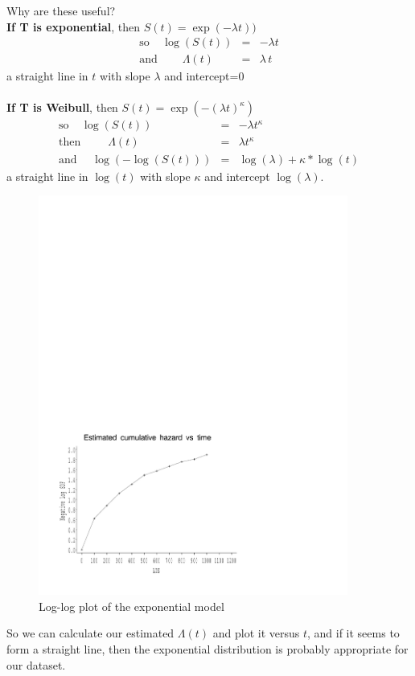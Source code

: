 \documentclass[11pt,psfig]{book}
\begin{document}
Why are these useful?
\\[2ex]
{\bf If T is exponential}, then $S(t) = \exp(-\lambda t))$
\begin{eqnarray*}
\mbox{so}~~~~~ \log(S(t)) & = & -\lambda t\\
\mbox{and}~~~~~~~~~~ \Lambda(t) & = & \lambda \, t
\end{eqnarray*}
a straight line in $t$ with slope $\lambda$ and intercept=0\\[1ex]
\\[2ex]
{\bf If T is Weibull}, then $S(t) = \exp(-(\lambda t)^\kappa)$
\begin{eqnarray*}
\mbox{so}~~~~~   \log(S(t)) & = & -\lambda t^\kappa\\
\mbox{then}~~~~~~~~~~~ \Lambda(t) & = &  \lambda t^\kappa\\
\mbox{and}~~~~~~  \log(-\log(S(t))) & = & \log(\lambda) + \kappa*\log(t)
\end{eqnarray*}
a straight line in $\log(t)$ with slope $\kappa$ and intercept $\log(\lambda)$.
\begin{figure}[h!]
\caption{Log-log plot of the exponential model}
\centerline{\includegraphics[width=4in]{nh_ls.pdf}}
\end{figure}
So we can calculate our estimated $\Lambda(t)$ and plot it versus $t$,
and if it seems to form a straight line, then the exponential
distribution is probably appropriate for our dataset.
\end{document}
